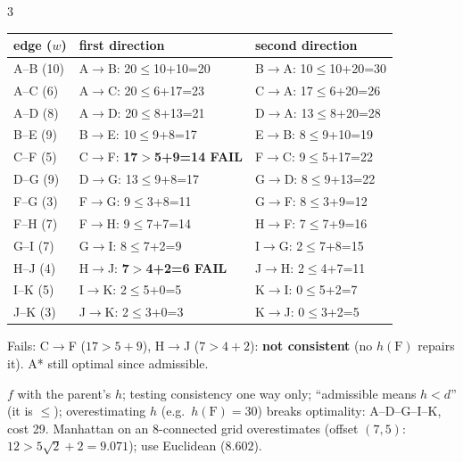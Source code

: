 \begin{multicols}{3}
\begin{worked}
\begin{tabularx}{\linewidth}{@{}lXX@{}}
edge ($w$) & first direction & second direction\\\midrule
A--B (10) & A$\to$B: 20$\le$10+10=20 & B$\to$A: 10$\le$10+20=30\\
A--C (6) & A$\to$C: 20$\le$6+17=23 & C$\to$A: 17$\le$6+20=26\\
A--D (8) & A$\to$D: 20$\le$8+13=21 & D$\to$A: 13$\le$8+20=28\\
B--E (9) & B$\to$E: 10$\le$9+8=17 & E$\to$B: 8$\le$9+10=19\\
C--F (5) & C$\to$F: \textbf{17$>$5+9=14 FAIL} & F$\to$C: 9$\le$5+17=22\\
D--G (9) & D$\to$G: 13$\le$9+8=17 & G$\to$D: 8$\le$9+13=22\\
F--G (3) & F$\to$G: 9$\le$3+8=11 & G$\to$F: 8$\le$3+9=12\\
F--H (7) & F$\to$H: 9$\le$7+7=14 & H$\to$F: 7$\le$7+9=16\\
G--I (7) & G$\to$I: 8$\le$7+2=9 & I$\to$G: 2$\le$7+8=15\\
H--J (4) & H$\to$J: \textbf{7$>$4+2=6 FAIL} & J$\to$H: 2$\le$4+7=11\\
I--K (5) & I$\to$K: 2$\le$5+0=5 & K$\to$I: 0$\le$5+2=7\\
J--K (3) & J$\to$K: 2$\le$3+0=3 & K$\to$J: 0$\le$3+2=5\\
\bottomrule\end{tabularx}\par\vspace{1pt}
Fails: C$\to$F ($17>5+9$), H$\to$J ($7>4+2$): \textbf{not consistent} (no $h(\text{F})$ repairs it). A* still optimal since admissible. \chk
\end{worked}
\begin{trap}
$f$ with the parent's $h$; testing consistency one way only; ``admissible means $h<d$'' (it is $\le$); overestimating $h$ (e.g.\ $h(\text{F})=30$) breaks optimality: A--D--G--I--K, cost 29. Manhattan on an 8-connected grid overestimates (offset $(7,5)$: $12>5\sqrt2+2=9.071$); use Euclidean ($8.602$). \chk
\end{trap}


\end{multicols}
